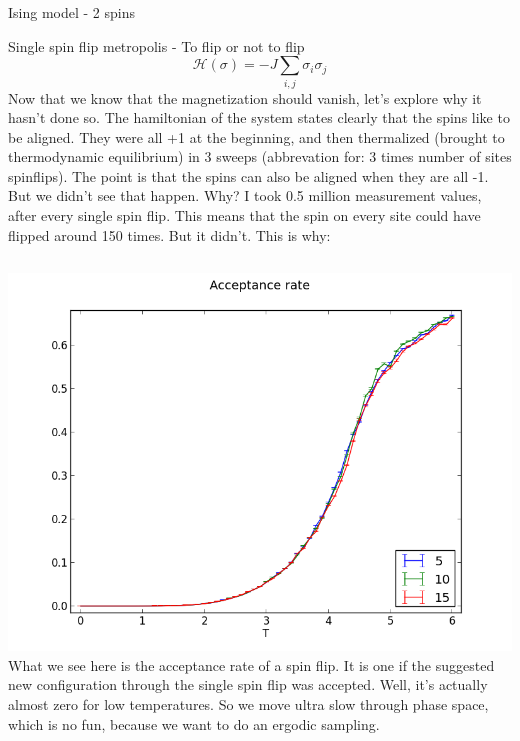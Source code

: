 \documentclass[handout]{beamer}
\begin{document}
\begin{frame}{Ising model - 2 spins}
\end{frame}

\begin{frame}{Single spin flip metropolis - To flip or not to flip}
\pause
\[ \mathscr{H}(\sigma) = -J \sum\limits_{i, j} \sigma_i \sigma_j \]
 {Now that we know that the magnetization should vanish, let's explore why it hasn't done so.}
 {The hamiltonian of the system states clearly that the spins like to be aligned. They were all +1 at the beginning, and then thermalized (brought to thermodynamic equilibrium) in 3 sweeps (abbrevation for: 3 times number of sites spinflips).}
 {The point is that the spins can also be aligned when they are all -1. But we didn't see that happen. Why?}
 {I took 0.5 million measurement values, after every single spin flip. This means that the spin on every site could have flipped around 150 times. But it didn't. This is why:}
\pause
\begin{columns}[c]
		\includegraphics[width=\textwidth]{img/single_acceptanceRate.png}
		 {What we see here is the acceptance rate of a spin flip. It is one if the suggested new configuration through the single spin flip was accepted. Well, it's actually almost zero for low temperatures. So we move ultra slow through phase space, which is no fun, because we want to do an ergodic sampling.}

\end{columns}
\end{frame}
\end{document}
